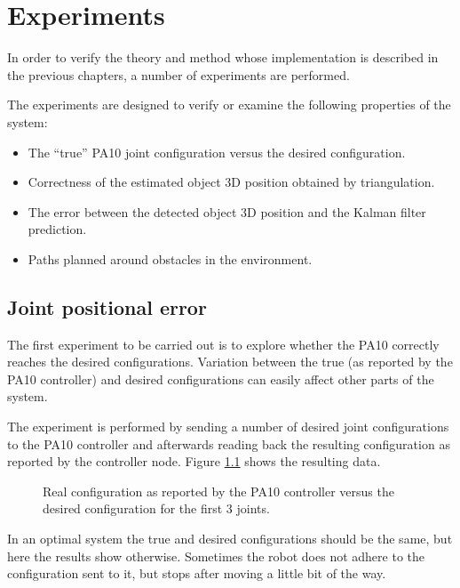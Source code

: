 \chapter{Experiments}
\label{cha:experiments}
In order to verify the theory and method whose implementation is described in the previous chapters, a number of experiments are performed.

The experiments are designed to verify or examine the following properties of the system:
\begin{itemize}
    \item The ``true'' PA10 joint configuration versus the desired configuration.
    \item Correctness of the estimated object 3D position obtained by triangulation. %
    \item The error between the detected object 3D position and the Kalman filter prediction.
    \item Paths planned around obstacles in the environment.
\end{itemize}


\section{Joint positional error}
The first experiment to be carried out is to explore whether the PA10 correctly reaches the desired configurations.
Variation between the true (as reported by the PA10 controller) and desired configurations can easily affect other parts of the system.

The experiment is performed by sending a number of desired joint configurations to the PA10 controller and afterwards reading back the resulting configuration as reported by the controller node. Figure \ref{fig:q_real_desired} shows the resulting data.

\begin{figure}[htb]
    \centering
    \resizebox{\columnwidth}{!}{%
        
    }
    \caption{Real configuration as reported by the PA10 controller versus the desired configuration for the first 3 joints.}
    \label{fig:q_real_desired}
\end{figure}

In an optimal system the true and desired configurations should be the same, but here the results show otherwise.
Sometimes the robot does not adhere to the configuration sent to it, but stops after moving a little bit of the way.

